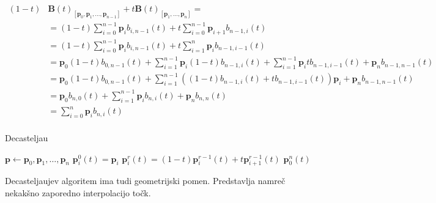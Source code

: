 \documentclass[isrm2, tisk]{fmfdelo}
\newcommand{\p}{\textbf{p}}
\newcommand{\lilb}[2]{b_{#1,#2}(t)}
\newcommand{\bigbbt}{\textbf{B}(t)}
\newcommand{\bernsteinsump}[2]{\sum_{#1=0}^{#2} \p_{#1}\lilb{#1}{#2}}
\begin{document}
    \begin{dokaz}
        \begin{align*}
        (1-t)
            &
            \bigbbt_{[\p_0,\p_1,\dots,\p_{n-1}]}+t\bigbbt_{[\p_1,\dots,\p_n]} = \\
            &= (1-t)\bernsteinsump{i}{n-1}+t\sum_{i=0}^{n-1} \p_{i+1}\lilb{n-1}{i} \\
            &= (1-t)\bernsteinsump{i}{n-1}+ t\sum_{i=1}^{n} \p_{i}\lilb{n-1}{i-1} \\
            &= \p_0(1-t)\lilb{0}{n-1} + \sum_{i=1}^{n-1}\p_{i}(1-t)\lilb{n-1}{i} +  \sum_{i=1}^{n-1} \p_{i}t\lilb{n-1}{i-1} + \p_n \lilb{n-1}{n-1} \\
            &= \p_0(1-t)\lilb{0}{n-1} + \sum_{i=1}^{n-1}\left((1-t)\lilb{n-1}{i} + t\lilb{n-1}{i-1}\right)\p_{i} + \p_n \lilb{n-1}{n-1} \\
            &= \p_0\lilb{n}{0} + \sum_{i=1}^{n-1}\p_{i}\lilb{n}{i} + \p_n \lilb{n}{n} \\
            &= \sum_{i=0}^{n}\p_{i}\lilb{n}{i} \\
        \end{align*}
    \end{dokaz}
    \begin{algorithm}
        \label{alg:decasteljau}
        \caption{Decasteljau}
        \begin{algorithmic}
            \State $\p \gets \p_0,\p_1,\dots,\p_n$
                \State $\p_i^0(t)=\p_i$
            \EndFor
                    \State $\p_i^r(t)=(1-t)\p_i^{r-1}(t)+t\p_{i+1}^{r-1}(t)$
                \EndFor
            \EndFor
            \State \Return $\p_0^n(t)$
        \end{algorithmic}
    \end{algorithm}

    Decasteljaujev algoritem ima tudi geometrijski pomen.
    Predstavlja namreč nekakšno zaporedno interpolacijo točk.
\end{document}
